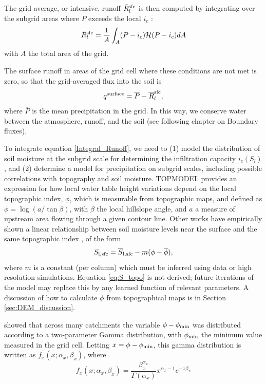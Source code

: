 \documentclass[twoside,10pt]{report}
\begin{document}
The grid average, or intensive, runoff $\bar{R}_l^{\rm sfc}$ is then computed by integrating over the subgrid areas where $P$ exceeds the local $i_c$ \citep{Entekhabi89}:
 \begin{equation}
    \bar{R}_l^{\rm sfc} =  \frac{1}{A}\int_{A} (P-i_c) \mathcal{H}(P-i_c) dA
    \label{Integral_Runoff}
\end{equation}
with $A$ the total area of the grid. 

The surface runoff in areas of the grid cell where these conditions are not met is zero, so that the grid-averaged flux into the soil is
 \begin{equation}
    q^{\rm surface} =  \overline{P} - \overline{R}_l^{\rm sfc},
    \label{flux_total}
\end{equation}
where $\overline{P}$ is the mean precipitation in the grid. In this way, we conserve water between the atmosphere, runoff, and the soil (see following chapter on Boundary fluxes). 

To integrate equation \eqref{Integral_Runoff}, we need to (1) model the distribution of soil moisture at the subgrid scale for determining the infiltration capacity $i_c(S_l)$, and (2) determine a model for precipitation on subgrid scales, including possible correlations with topography and soil moisture. TOPMODEL provides an expression for how local water table height variations depend on the local topographic index, $\phi$, which is measurable from topographic maps, and defined as $\phi = \log{(a/\tan{\beta})}$, with $\beta$ the local hillslope angle, and $a$ a measure of upstream area flowing through a given contour line. Other works have empirically shown a linear relationship between soil moisture levels near the surface and the same topographic index \citep{Sorensen06}, of the form
 \begin{equation}\label{eq:S_topo}
   S_{\rm l, sfc} = \overline{S}_{ \rm l, sfc} - m (\phi - \overline{\phi}),
\end{equation}
where $m$ is a constant (per column) which must be inferred using data or high resolution simulations. Equation \eqref{eq:S_topo} is not derived; future iterations of the model may replace this by any learned function of relevant parameters. A discussion of how to calculate $\phi$ from topographical maps is in Section \ref{sec:DEM_discussion}.  

\citet{Sivapalan87} showed that across many catchments the variable $\phi-\phi_{\rm min}$ was distributed according to a two-parameter Gamma distribution, with $\phi_{\rm min}$ the minimum value measured in the grid cell. Letting $x = \phi-\phi_{\rm min}$, this gamma distribution is written as $f_{x}(x; \alpha_x, \beta_x)$, where 
\begin{equation}
    f_{x}(x; \alpha_x, \beta_x) =\frac{\beta_x^{\alpha_x}}{\Gamma(\alpha_x)}x^{\alpha_x-1}e^{-x \beta_x}
    \label{gamma}
\end{equation}
\end{document}
